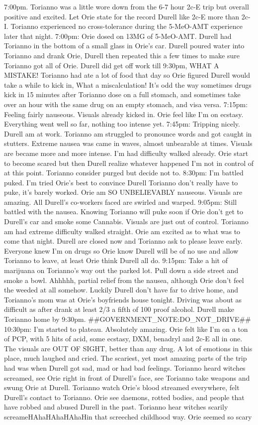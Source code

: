\documentclass[12pt]{book}
\begin{document}
7:00pm. Torianno was a little wore down from the 6-7 hour 2c-E trip but overall positive and excited. Let Orie state for the record Durell like 2c-E more than 2c-I. Torianno experienced no cross-tolerance during the 5-MeO-AMT experience later that night. 7:00pm: Orie dosed on 13MG of 5-MeO-AMT. Durell had Torianno in the bottom of a small glass in Orie's car. Durell poured water into Torianno and drank Orie, Durell then repeated this a few times to make sure Torianno got all of Orie. Durell did get off work till 9:30pm, WHAT A MISTAKE! Torianno had ate a lot of food that day so Orie figured Durell would take a while to kick in, What a miscalculation! It's odd the way sometimes drugs kick in 15 minutes after Torianno dose on a full stomach, and sometimes take over an hour with the same drug on an empty stomach, and visa versa. 7:15pm: Feeling fairly nauseous. Visuals already kicked in. Orie feel like I'm on ecstasy. Everything went well so far, nothing too intense yet. 7:45pm: Tripping nicely. Durell am at work. Torianno am struggled to pronounce words and got caught in stutters. Extreme nausea was came in waves, almost unbearable at times. Visuals are became more and more intense. I'm had difficulty walked already. Orie start to become scared but then Durell realize whatever happened I'm not in control of at this point. Torianno consider purged but decide not to. 8:30pm: I'm battled puked. I'm tried Orie's best to convince Durell Torianno don't really have to puke, it's barely worked. Orie am SO UNBELIEVABLY nauseous. Visuals are amazing. All Durell's co-workers faced are swirled and warped. 9:05pm: Still battled with the nausea. Knowing Torianno will puke soon if Orie don't get to Durell's car and smoke some Cannabis. Visuals are just out of control. Torianno am had extreme difficulty walked straight. Orie am excited as to what was to come that night. Durell are closed now and Torianno ask to please leave early. Everyone knew I'm on drugs so Orie know Durell will be of no use and allow Torianno to leave, at least Orie think Durell all do. 9:15pm: Take a hit of marijuana on Torianno's way out the parked lot. Pull down a side street and smoke a bowl. Ahhhhh, partial relief from the nausea, although Orie don't feel the weeded at all somehow. Luckily Durell don't have far to drive home, and Torianno's mom was at Orie's boyfriends house tonight. Driving was about as difficult as after drank at least 2/3 a fifth of 100 proof alcohol. Durell make Torianno home by 9:30pm. \#\#GOVERNMENT\_NOTE:DO\_NOT\_DRIVE\#\# 10:30pm: I'm started to plateau. Absolutely amazing. Orie felt like I'm on a ton of PCP, with 5 hits of acid, some ecstasy, DXM, benadryl and 2c-E all in one. The visuals are OUT OF SIGHT, better than any drug. A lot of emotions in this place, much laughed and cried. The scariest, yet most amazing parts of the trip had was when Durell got sad, mad or had bad feelings. Torianno heard witches screamed, see Orie right in front of Durell's face, see Torianno take weapons and swung Orie at Durell. Torianno watch Orie's blood streamed everywhere, felt Durell's contact to Torianno. Orie see daemons, rotted bodies, and people that have robbed and abused Durell in the past. Torianno hear witches scarily screameHAhaHAhaHAhaHin that screeched childhood way. Orie seemed so scary 
\end{document}
